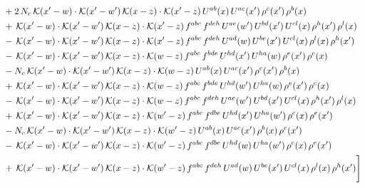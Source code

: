 \documentclass[9pt]{article}
\numberwithin{equation}{section}
\begin{document}
\begin{align}
& +2\,N_{c}\,\mathcal{K}(x'-w)\cdot\mathcal{K}(x'-w')\,\mathcal{K}(x-z)\cdot\mathcal{K}(x'-z)\,U^{ab}(x)\,U^{ac}(x')\,\rho^{c}(x')\,\rho^{b}(x)\notag\\
& +\,\mathcal{K}(x'-w)\cdot\mathcal{K}(x'-w')\,\mathcal{K}(x-z)\cdot\mathcal{K}(x'-z)\,f^{abc}\,f^{deh}\,U^{ae}(w')\,U^{bd}(x')\,U^{cl}(x)\,\rho^{h}(x')\,\rho^{l}(x)\notag\\
& -\,\mathcal{K}(x'-w)\cdot\mathcal{K}(x'-w')\,\mathcal{K}(x-z)\cdot\mathcal{K}(x'-z)\,f^{abc}\,f^{deh}\,U^{ad}(w)\,U^{be}(x')\,U^{cl}(x)\,\rho^{l}(x)\,\rho^{h}(x')\notag\\
& -\,\mathcal{K}(x'-w)\cdot\mathcal{K}(x'-w')\,\mathcal{K}(x-z)\cdot\mathcal{K}(w-z)\,f^{abc}\,f^{bde}\,U^{hd}(x')\,U^{ha}(w)\,\rho^{e}(x')\,\rho^{c}(x)\notag\\
& -N_{c}\,\mathcal{K}(x'-w)\cdot\mathcal{K}(x'-w')\,\mathcal{K}(x-z)\cdot\mathcal{K}(w-z)\,U^{ab}(x)\,U^{ac}(x')\,\rho^{c}(x')\,\rho^{b}(x)\notag\\
& +\,\mathcal{K}(x'-w)\cdot\mathcal{K}(x'-w')\,\mathcal{K}(x-z)\cdot\mathcal{K}(w-z)\,f^{abc}\,f^{bde}\,U^{hd}(w')\,U^{ha}(w)\,\rho^{e}(x')\,\rho^{c}(x)\notag\\
& -\,\mathcal{K}(x'-w)\cdot\mathcal{K}(x'-w')\,\mathcal{K}(x-z)\cdot\mathcal{K}(w-z)\,f^{abc}\,f^{deh}\,U^{ae}(w')\,U^{bd}(x')\,U^{cl}(x)\,\rho^{h}(x')\,\rho^{l}(x)\notag\\
& +\,\mathcal{K}(x'-w)\cdot\mathcal{K}(x'-w')\,\mathcal{K}(x-z)\cdot\mathcal{K}(w'-z)\,f^{abc}\,f^{dbe}\,U^{hd}(x')\,U^{ha}(w')\,\rho^{c}(x)\,\rho^{e}(x')\notag\\
& -N_{c}\,\mathcal{K}(x'-w)\cdot\mathcal{K}(x'-w')\,\mathcal{K}(x-z)\cdot\mathcal{K}(w'-z)\,U^{ab}(x)\,U^{ac}(x')\,\rho^{b}(x)\,\rho^{c}(x')\notag\\
& -\,\mathcal{K}(x'-w)\cdot\mathcal{K}(x'-w')\,\mathcal{K}(x-z)\cdot\mathcal{K}(w'-z)\,f^{abc}\,f^{dbe}\,U^{hd}(w)\,U^{ha}(w')\,\rho^{c}(x)\,\rho^{e}(x')\notag\\
& +\,\mathcal{K}(x'-w)\cdot\mathcal{K}(x'-w')\,\mathcal{K}(x-z)\cdot\mathcal{K}(w'-z)\,f^{abc}\,f^{deh}\,U^{ad}(w)\,U^{be}(x')\,U^{cl}(x)\,\rho^{l}(x)\,\rho^{h}(x') \Bigg]
\end{align}
\end{document}
